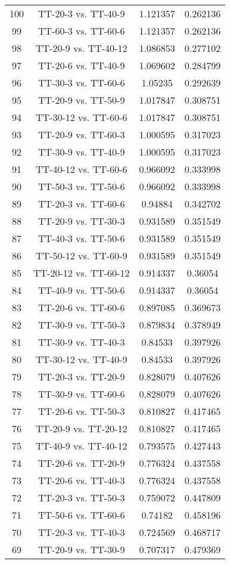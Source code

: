 \documentclass[a4paper,10pt]{article}
\begin{document}
\begin{landscape}
\begin{table}[!htp]
\begin{tabular}{cccc}
100&TT-20-3 vs. TT-40-9&1.121357&0.262136\\
99&TT-60-3 vs. TT-60-6&1.121357&0.262136\\
98&TT-20-9 vs. TT-40-12&1.086853&0.277102\\
97&TT-20-6 vs. TT-40-9&1.069602&0.284799\\
96&TT-30-3 vs. TT-60-6&1.05235&0.292639\\
95&TT-20-9 vs. TT-50-9&1.017847&0.308751\\
94&TT-30-12 vs. TT-60-6&1.017847&0.308751\\
93&TT-20-9 vs. TT-60-3&1.000595&0.317023\\
92&TT-30-9 vs. TT-40-9&1.000595&0.317023\\
91&TT-40-12 vs. TT-60-6&0.966092&0.333998\\
90&TT-50-3 vs. TT-50-6&0.966092&0.333998\\
89&TT-20-3 vs. TT-60-6&0.94884&0.342702\\
88&TT-20-9 vs. TT-30-3&0.931589&0.351549\\
87&TT-40-3 vs. TT-50-6&0.931589&0.351549\\
86&TT-50-12 vs. TT-60-9&0.931589&0.351549\\
85&TT-20-12 vs. TT-60-12&0.914337&0.36054\\
84&TT-40-9 vs. TT-50-6&0.914337&0.36054\\
83&TT-20-6 vs. TT-60-6&0.897085&0.369673\\
82&TT-30-9 vs. TT-50-3&0.879834&0.378949\\
81&TT-30-9 vs. TT-40-3&0.84533&0.397926\\
80&TT-30-12 vs. TT-40-9&0.84533&0.397926\\
79&TT-20-3 vs. TT-20-9&0.828079&0.407626\\
78&TT-30-9 vs. TT-60-6&0.828079&0.407626\\
77&TT-20-6 vs. TT-50-3&0.810827&0.417465\\
76&TT-20-9 vs. TT-20-12&0.810827&0.417465\\
75&TT-40-9 vs. TT-40-12&0.793575&0.427443\\
74&TT-20-6 vs. TT-20-9&0.776324&0.437558\\
73&TT-20-6 vs. TT-40-3&0.776324&0.437558\\
72&TT-20-3 vs. TT-50-3&0.759072&0.447809\\
71&TT-50-6 vs. TT-60-6&0.74182&0.458196\\
70&TT-20-3 vs. TT-40-3&0.724569&0.468717\\
69&TT-20-9 vs. TT-30-9&0.707317&0.479369\\

\end{tabular}
\end{table}
\end{landscape}
\end{document}
